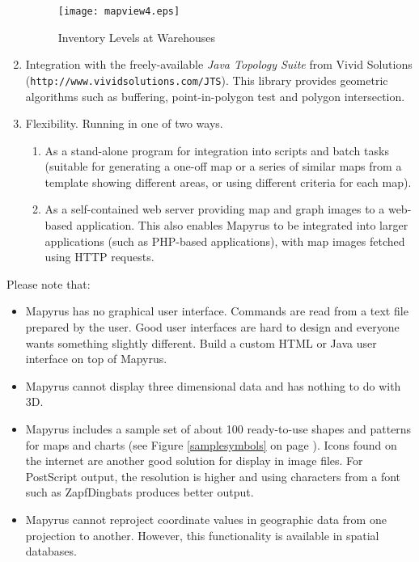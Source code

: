 \begin{enumerate}
\begin{figure}
\texttt{[image: mapview4.eps]}
\caption{Inventory Levels at Warehouses}
\label{mapview4}
\end{figure}


\item
Integration with the freely-available
\textit{Java Topology Suite} from Vivid Solutions
(\texttt{http://www.vividsolutions.com/JTS}).
This library provides geometric algorithms
such as buffering, point-in-polygon test and polygon intersection.

\item
Flexibility.  Running in one of two ways.

\begin{enumerate}
\item
As a stand-alone program for integration into
scripts and batch tasks (suitable for generating a one-off
map or a series of similar maps from a template
showing different areas, or using different criteria for each map).

\item
As a self-contained web server providing map and
graph images to a web-based application.
This also enables Mapyrus to be integrated into larger applications
(such as PHP-based applications),
with map images fetched using HTTP requests.

\end{enumerate}

\end{enumerate}


Please note that:

\begin{itemize}

\item
Mapyrus has no graphical user interface.
Commands are read from a text file prepared by the user.
Good user interfaces are
hard to design and everyone wants something slightly different.
Build a custom HTML or Java user interface on top of Mapyrus.

\item
Mapyrus cannot display three dimensional data and has nothing to do
with 3D.

\item
Mapyrus includes a sample set of about 100 ready-to-use shapes and patterns
for maps and charts (see Figure \ref{samplesymbols}
on page \pageref{samplesymbols}).
Icons found on the
internet are another good solution for display in image files.
For PostScript output, the resolution is higher and using characters
from a font such as ZapfDingbats produces better output.

\item
Mapyrus cannot reproject coordinate values in geographic data from
one projection to another.  However, this functionality
is available in spatial databases.
\end{itemize}

